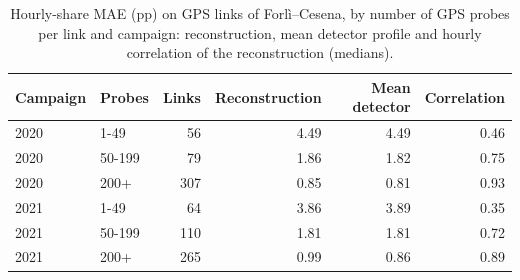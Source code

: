 \begin{table}[htbp]\centering
\caption{Hourly-share MAE (pp) on GPS links of Forl\`i--Cesena, by number of GPS probes per link and campaign: reconstruction, mean detector profile and hourly correlation of the reconstruction (medians).}
\label{tab:probes}
\begin{tabular}{@{}llrrrr@{}}\toprule
Campaign & Probes & Links & Reconstruction & Mean detector & Correlation \\\midrule
2020 & 1-49 & 56 & 4.49 & 4.49 & 0.46 \\
2020 & 50-199 & 79 & 1.86 & 1.82 & 0.75 \\
2020 & 200+ & 307 & 0.85 & 0.81 & 0.93 \\
2021 & 1-49 & 64 & 3.86 & 3.89 & 0.35 \\
2021 & 50-199 & 110 & 1.81 & 1.81 & 0.72 \\
2021 & 200+ & 265 & 0.99 & 0.86 & 0.89 \\
\bottomrule\end{tabular}\end{table}
